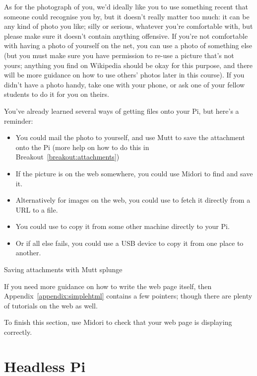 As for the photograph of you, we'd ideally like you to use something recent that someone could recognise you by, but it doesn't really matter too much: it can be any kind of photo you like; silly or serious, whatever you're comfortable with, but please make sure it doesn't contain anything offensive. If you're not comfortable with having a photo of yourself on the net, you can use a photo of something else (but you must make sure you have permission to re-use a picture that's not yours; anything you find on Wikipedia should be okay for this purpose, and there will be more guidance on how to use others' photos later in this course). If you didn't have a photo handy, take one with your phone, or ask one of your fellow students to do it for you on theirs.

You've already learned several ways of getting files onto your Pi, but here's a reminder:
\begin{itemize}
\item You could mail the photo to yourself, and use Mutt to save the attachment onto the Pi (more help on how to do this in Breakout~\ref{breakout:attachments})
\item If the picture is on the web somewhere, you could use Midori to find and save it. 
\item Alternatively for images on the web, you could use  to fetch it directly from a URL to a file. 
\item You could use  to copy it from some other machine directly to your Pi. 
\item Or if all else fails, you could use a USB device to copy it from one place to another. 
\end{itemize}

\begin{diversion}{Saving attachments with Mutt}
\label{breakout:attachments}
splunge
\end{diversion}

If you need more guidance on how to write the web page itself, then Appendix~\ref{appendix:simplehtml} contains a few pointers; though there are plenty of tutorials on the web as well. 

To finish this section, use Midori to check that your web page is displaying correctly.

\section{Headless Pi}
\label{section:headless}



